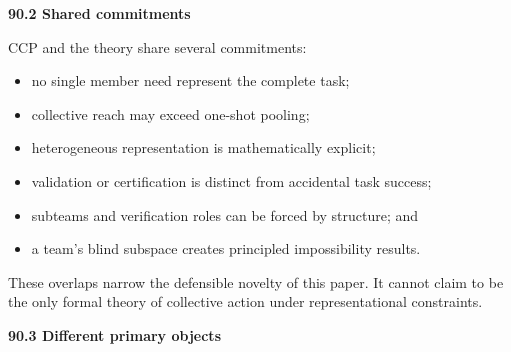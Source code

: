 \documentclass[11pt,letterpaper]{article}
\newcommand{\subtopic}[1]{%
 \vspace{0.45em}
 {\bfseries\color{AccentColor} #1\par}
}
\theoremstyle{plain}
\theoremstyle{definition}
\begin{document}
\subtopic{90.2 Shared commitments}

CCP and the theory share several commitments:
\begin{itemize}
\item no single member need represent the complete task;
\item collective reach may exceed one-shot pooling;
\item heterogeneous representation is mathematically explicit;
\item validation or certification is distinct from accidental task success;
\item subteams and verification roles can be forced by structure; and
\item a team's blind subspace creates principled impossibility results.
\end{itemize}
These overlaps narrow the defensible novelty of this paper. It
cannot claim to be the only formal theory of collective action under
representational constraints.

\subtopic{90.3 Different primary objects}
\end{document}
